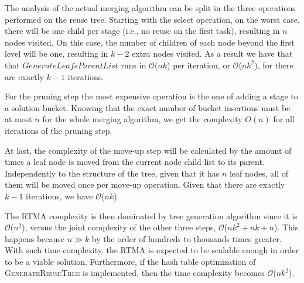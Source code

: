 
The analysis of the actual merging algorithm can be split in the three operations performed on the reuse tree. Starting with the select operation, on the worst case, there will be one child per stage (i.e., no reuse on the first task), resulting in $n$ nodes visited. On this case, the number of children of each node beyond the first level will be one, resulting in $k-2$ extra nodes visited. As a result we have that that $GenerateLeafsParentList$ runs in $\mathcal{O}$($nk$) per iteration, or $\mathcal{O}$($nk^2$), for there are exactly $k-1$ iterations.

For the pruning step the most expensive operation is the one of adding a stage to a solution bucket. Knowing that the exact number of bucket insertions must be at most $n$ for the whole merging algorithm, we get the complexity $O(n)$ for all iterations of the pruning step. 

At last, the complexity of the move-up step will be calculated by the amount of times a leaf node is moved from the current node child list to its parent. Independently to the structure of the tree, given that it has $n$ leaf nodes, all of them will be moved once per move-up operation. Given that there are exactly $k-1$ iterations, we have $\mathcal{O}$($nk$).

The RTMA complexity is then dominated by tree generation algorithm since it is $\mathcal{O}$($n^2$), versus the joint complexity of the other three steps, $\mathcal{O}$($nk^2 + nk + n$). This happens because $n \gg k$ by the order of hundreds to thousands times greater. With such time complexity, the RTMA is expected to be scalable enough in order to be a viable solution. Furthermore, if the hash table optimization of {\scshape GenerateReuseTree} is implemented, then the time complexity becomes $\mathcal{O}$($nk^2$).

